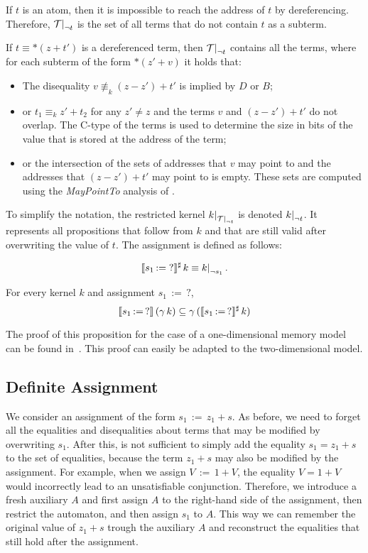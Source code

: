 If $t$ is an atom, then it is impossible to reach the address of $t$ by dereferencing.
Therefore, $\restr{\T}{\neg t}$ is the set of all terms that do not contain $t$ as a subterm.

If $t \equiv *(z + t')$ is a dereferenced term, then $\restr{\T}{\neg t}$ contains all the terms, where for each subterm of the form $*(z' + v)$ it holds that:
\begin{itemize}
	\item\label{item:diseqs} The disequality $v \nequiv_k (z - z') + t'$ is implied by $D$ or $B$;
    \item\label{item:eqs} or $t_1 \equiv_k z' + t_2$ for any $z' \neq z$ and the terms $v$ and $(z - z') + t'$ do not overlap. The C-type of the terms is used to determine the size in bits of the value that is stored at the address of the term;
    \item or the intersection of the sets of addresses that $v$ may point to and the addresses that $(z - z') + t'$ may point to is empty.
    These sets are computed using the \emph{MayPointTo} analysis of \goblint.
\end{itemize}

To simplify the notation, the restricted kernel $\restr{k}{\restr{\T}{\neg t}}$ is denoted $\restr{k}{\neg t}$.
It represents all propositions that follow from $k$ and that are still valid after overwriting the value of $t$.
The assignment is defined as follows:

\[
	\sem{s_1\,{:=}\;?}^\sharp\,k \equiv \restr{k}{\neg s_1}.
\]

\begin{proposition}\label{p:ass-unknown}
	For every kernel $k$ and assignment $s_1\,{:=}\,?$,
	\[
		\llbracket s_1\,{:=}\,?\rrbracket\,(\gamma\,k) \subseteq \gamma\,(\llbracket s_1\,{:=}\,?\rrbracket^\sharp\,k)
	\]
\end{proposition}

The proof of this proposition for the case of a one-dimensional memory model can be found in~\cite{2pointer}.
This proof can easily be adapted to the two-dimensional model.

\subsection{Definite Assignment}

We consider an assignment of the form $s_1\,{:=}\,z_1+s$.
As before, we need to forget all the equalities and disequalities about terms that may be modified by overwriting $s_1$.
After this, is not sufficient to simply add the equality $s_1 = z_1+s$ to the set of equalities,
because the term $z_1 + s$ may also be modified by the assignment. For example, when we assign $V\,{:=}\,1+V$, the equality $V = 1 + V$ would incorrectly lead to an unsatisfiable conjunction.
Therefore, we introduce a fresh auxiliary $A$ and first assign $A$ to the right-hand side of the assignment, then restrict the automaton, and then assign $s_1$ to $A$.
This way we can remember the original value of $z_1 + s$ trough the auxiliary $A$ and reconstruct the equalities that still hold after the assignment.


